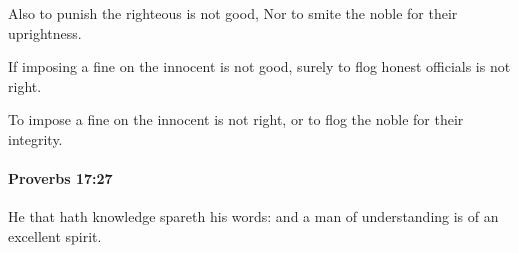 			\begin{versebox}
					\item[BHS] 
					\item[ASV] Also to punish the righteous is not good, Nor to smite the noble for their uprightness.
					\item[NIV] If imposing a fine on the innocent is not good, surely to flog honest officials is not right.
					\item[NRSV] To impose a fine on the innocent is not right, or to flog the noble for their integrity.
			\end{versebox}

		\paragraph{Proverbs 17:27} %
			\label{PROVERBS-17-27}

			He that hath knowledge spareth his words: and a man of understanding is of an excellent spirit.

